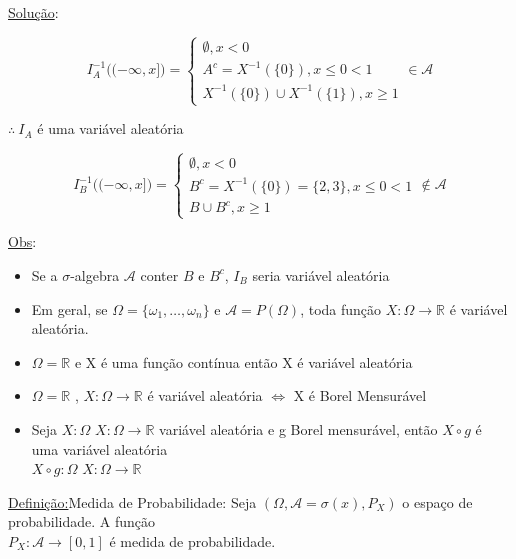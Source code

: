 \documentclass[a4paper,12pt]{article}
\begin{document}
\underline{Solução}:

$$I_A^{-1}\bigg ( (-\infty,x] \bigg) = \begin{cases}
\emptyset, x<0\\
A^c=X^{-1}(\{0\}), x\le 0 <1\\
X^{-1}(\{0\})\cup X^{-1}(\{1\}), x\ge 1
\end{cases} \in \mathscr{A} $$

$\therefore  \ I_A$ é uma variável aleatória

$$I_B^{-1}\bigg ( (-\infty,x] \bigg) = \begin{cases}
\emptyset, x<0\\
B^c=X^{-1}(\{0\})=\{2,3\}, x\le 0 <1\\
B\cup B^c, x\ge 1
\end{cases} \notin \mathscr{A} $$

\underline{Obs}:
\begin{itemize}
	\item 

Se a $\sigma$-algebra $\mathscr{A}$ conter $B$ e $B^c$, $I_B$ seria variável aleatória 
\item 
Em geral, se $\Omega = \{\omega_1,\ldots, \omega_n\}$ e $\mathscr{A}=P(\Omega)$, toda  função  $X:\Omega \longrightarrow \mathbb{R} $
é variável aleatória.
\item 
$\Omega = \mathbb{R}$ e X é uma função contínua então  X é variável aleatória
\item 

$\Omega = \mathbb{R}$ ,  $X:\Omega \longrightarrow \mathbb{R} $ é variável aleatória $\Leftrightarrow$ X é Borel Mensurável

\item 
Seja $X:\Omega$  $X:\Omega \longrightarrow \mathbb{R} $  variável aleatória e g Borel mensurável, então
$X\circ g$ é uma variável aleatória\\
$X\circ g :\Omega$  $X:\Omega \longrightarrow \mathbb{R}$

\end{itemize}
\newpage
\underline{Definição:}Medida de Probabilidade:
Seja $(\Omega,\mathscr{A}=\sigma(x),P_X)$ o espaço de probabilidade. A função \\
$P_X: \mathscr{A}\longrightarrow[0,1] $ é medida de probabilidade.\\
\end{document}
